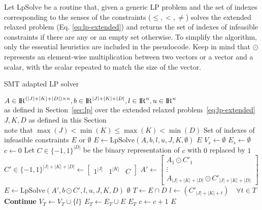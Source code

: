 \documentclass[runningheads]{llncs}
\begin{document}
Let $\text{LpSolve}$ be a routine that, given a generic LP problem and the set of indexes corresponding to the senses of the constraints ($\le, <, \ne$) solves the extended relaxed problem (Eq. \eqref{eq:lp-extended}) and returns the set of indexes of infeasible constraints if there are any or an empty set otherwise.
To simplify the algorithm, only the essential heuristics are included in the pseudocode.
Keep in mind that $\odot$ represents an element-wise multiplication between two vectors or a vector and a scalar, with the scalar repeated to match the size of the vector.
\begin{algorithm}
    \caption{SMT adapted LP solver}\label{alg:theory-solver}
    \begin{algorithmic}
        \Require $A \in {\rm I\!R}^{(|J| + |K| + |D|) \times n}, b \in {\rm I\!R}^{|J| + |K| + |D|}, l \in {\rm I\!R}^n, u \in {\rm I\!R}^n$ \\
        \qquad as defined in Section~\ref{sec:lp} over the extended relaxed problem~\eqref{eq:lp-extended}
        \Require $J, K, D$ as defined in this Section \\
        \qquad note that $\max(J) < \min(K) \le \max(K) < \min(D)$
        \Ensure Set of indexes of infeasible constraints $E$ or $\emptyset$
        \State $E \gets \text{LpSolve}(A, b, l, u, J, K, \emptyset)$ 
        \State \Return $E$
        \EndIf
        \State $V_s \gets \emptyset$
        \State $E_s \gets \emptyset$
        \EndFor
        \State $c \gets 0$ 
        \State Let $C \in \{-1, 1\}^{|D|}$ be the binary representation of $c$ with $0$ replaced by $1$
        \State $C' \in \{-1, 1\}^{|J|+|K|+|D|} \gets \begin{bmatrix} 1^{|J|} & 1^{|K|} & C\end{bmatrix}$
        \State $A' \gets \begin{bmatrix}A_1 \odot C'_1 \\ \vdots \\ A_{|J|+|K|+|D|} \odot C'_{|J|+|K|+|D|}\end{bmatrix}$
        \State $E \gets \text{LpSolve}(A', b \odot C', l, u, J, K, D)$
         
        \State \Return $\emptyset$
        \EndIf
        \State $T \gets E \cap D$
        \State $l \gets (C'_{|J| + |K| + t}) \quad \forall t \in T$
         
        \State \textbf{Continue}
        \EndIf
        \State $V_T \gets V_T \cup \{l\}$
        \State $E_T \gets E_T \cup E$
         
        \State \Return $E_T$
        \EndIf
        \State $c \gets c + 1$
        \EndWhile
        \State \Return $E$
    \end{algorithmic}
\end{algorithm}
\end{document}
